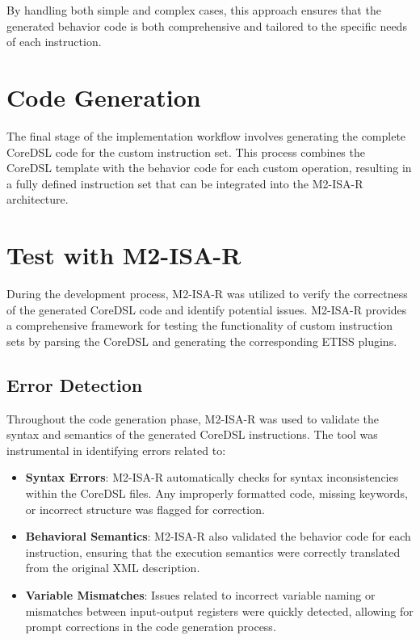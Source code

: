 By handling both simple and complex cases, this approach ensures that the generated behavior code is both comprehensive and tailored to the specific needs of each instruction.

\section{Code Generation}

The final stage of the implementation workflow involves generating the complete CoreDSL code for the custom instruction set. This process combines the CoreDSL template with the behavior code for each custom operation, resulting in a fully defined instruction set that can be integrated into the M2-ISA-R architecture.

\section{Test with M2-ISA-R}

During the development process, M2-ISA-R was utilized to verify the correctness of the generated CoreDSL code and identify potential issues. M2-ISA-R provides a comprehensive framework for testing the functionality of custom instruction sets by parsing the CoreDSL and generating the corresponding ETISS plugins.

\subsection{Error Detection}

Throughout the code generation phase, M2-ISA-R was used to validate the syntax and semantics of the generated CoreDSL instructions. The tool was instrumental in identifying errors related to:

\begin{itemize}
    \item \textbf{Syntax Errors}: M2-ISA-R automatically checks for syntax inconsistencies within the CoreDSL files. Any improperly formatted code, missing keywords, or incorrect structure was flagged for correction.
    \item \textbf{Behavioral Semantics}: M2-ISA-R also validated the behavior code for each instruction, ensuring that the execution semantics were correctly translated from the original XML description.
    \item \textbf{Variable Mismatches}: Issues related to incorrect variable naming or mismatches between input-output registers were quickly detected, allowing for prompt corrections in the code generation process.
\end{itemize}

